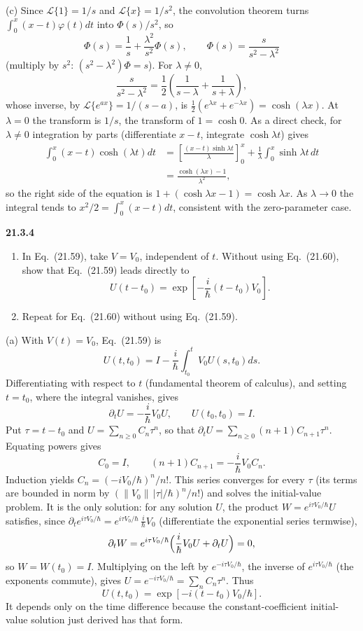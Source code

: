 (c) Since $\mathcal L\{1\}=1/s$ and $\mathcal L\{x\}=1/s^2$, the
convolution theorem turns $\int_0^x(x-t)\varphi(t)dt$ into
$\Phi(s)/s^2$, so
\[
\Phi(s)=\frac1s+\frac{\lambda^2}{s^2}\Phi(s),\qquad
\Phi(s)=\frac{s}{s^2-\lambda^2}
\]
(multiply by $s^2$: $(s^2-\lambda^2)\Phi=s$).
For $\lambda\ne0$,
\[
\frac{s}{s^2-\lambda^2}
=\frac12\left(\frac1{s-\lambda}+\frac1{s+\lambda}\right),
\]
whose inverse, by $\mathcal L\{e^{ax}\}=1/(s-a)$, is
$\frac12(e^{\lambda x}+e^{-\lambda x})=\cosh(\lambda x)$. At
$\lambda=0$ the transform is $1/s$, the transform of $1=\cosh0$.
As a direct check, for $\lambda\ne0$ integration by parts
(differentiate $x-t$, integrate $\cosh\lambda t$) gives
\[
\begin{aligned}
\int_0^x(x-t)\cosh(\lambda t)dt
&=\left[\frac{(x-t)\sinh\lambda t}{\lambda}\right]_0^x
+\frac1\lambda\int_0^x\sinh\lambda t\,dt\\
&=\frac{\cosh(\lambda x)-1}{\lambda^2},
\end{aligned}
\]
so the right side of the equation is
$1+(\cosh\lambda x-1)=\cosh\lambda x$. As $\lambda\to0$ the integral
tends to $x^2/2=\int_0^x(x-t)dt$, consistent with the zero-parameter
case.


\par\bigskip
\noindent\textbf{21.3.4}
\begin{enumerate}
\item[(a)] In Eq.~(21.59), take $V=V_{0}$, independent of $t$.
Without using Eq.~(21.60), show that Eq.~(21.59) leads directly
to
\[
U(t-t_{0})=\exp\left[-\frac{i}{\hbar}(t-t_{0})V_{0}\right].
\]
\item[(b)] Repeat for Eq.~(21.60) without using Eq.~(21.59).
\end{enumerate}
\solution
(a) With $V(t)=V_0$, Eq.~(21.59) is
\[
U(t,t_0)=I-\frac{i}{\hbar}\int_{t_0}^tV_0U(s,t_0)ds.
\]
Differentiating with respect to $t$ (fundamental theorem of calculus),
and setting $t=t_0$, where the integral vanishes, gives
\[
\partial_tU=-\frac{i}{\hbar}V_0U,\qquad U(t_0,t_0)=I.
\]
Put $\tau=t-t_0$ and $U=\sum_{n\ge0}C_n\tau^n$, so that
$\partial_tU=\sum_{n\ge0}(n+1)C_{n+1}\tau^n$.
Equating powers gives
\[
C_0=I,\qquad (n+1)C_{n+1}
=-\frac{i}{\hbar}V_0C_n.
\]
Induction yields
$C_n=(-iV_0/\hbar)^n/n!$. This series converges for every $\tau$
(its terms are bounded in norm by $(\|V_0\|\,|\tau|/\hbar)^n/n!$) and
solves the initial-value problem. It is the only solution: for any
solution $U$, the product $W=e^{i\tau V_0/\hbar}U$ satisfies, since
$\partial_te^{i\tau V_0/\hbar}=e^{i\tau V_0/\hbar}\,\frac{i}{\hbar}V_0$
(differentiate the exponential series termwise),
\[
\partial_tW=e^{i\tau V_0/\hbar}\Bigl(\frac{i}{\hbar}V_0U+\partial_tU\Bigr)=0,
\]
so $W=W(t_0)=I$. Multiplying on the left by $e^{-i\tau V_0/\hbar}$, the
inverse of $e^{i\tau V_0/\hbar}$ (the exponents commute), gives
$U=e^{-i\tau V_0/\hbar}=\sum_nC_n\tau^n$. Thus
\[
\boxed{U(t,t_0)=
\exp[-i(t-t_0)V_0/\hbar]}.
\]
It depends only on the time difference because the constant-coefficient
initial-value solution just derived has that form.

